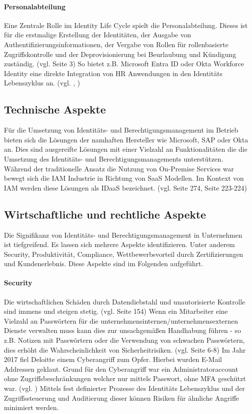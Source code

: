 \documentclass[11pt]{article}
\begin{document}
\paragraph{Personalabteilung}
Eine Zentrale Rolle im Identity Life Cycle spielt die Personalabteilung. Dieses ist für die erstmalige Erstellung der Identitäten, der Ausgabe von Authentifizierungsinformationen, der Vergabe von Rollen für rollenbasierte Zugriffskontrolle und der Deprovisionierung bei Beurlaubung und Kündigung zuständig. (vgl. \cite{mohammed2017systematic} Seite 3) So bietet z.B. Microsoft Entra ID oder Okta Workforce Identity eine direkte Integration von HR Anwendungen in den Identitäts Lebenszyklus an. (vgl. \cite{oktahr}, \cite{Billmath2024})
\subsection{Technische Aspekte}
Für die Umsetzung von Identitäts- und Berechtigungsmanagement im Betrieb bieten sich die Lösungen der namhaften Hersteller wie Microsoft, SAP oder Okta an. Dies sind ausgereifte Lösungen mit einer Vielzahl an Funktionalitäten die die Umsetzung des Identitäts- und Berechtigungsmanagements unterstützen. Während der traditionelle Ansatz die Nutzung von On-Premise Services war bewegt sich die IAM Industrie in Richtung von SaaS Modellen. Im Kontext von IAM werden diese Lösungen als IDaaS bezeichnet. (vgl. \cite{kunz2014analyzing} Seite 274, \cite{tsolkas2017} Seite 223-224)
\subsection{Wirtschaftliche und rechtliche Aspekte}
Die Signifikanz von Identitäts- und Berechtigungsmanagement in Unternehmen ist tiefgreifend. Es lassen sich mehrere Aspekte identifizieren. Unter anderem Security, Produktivität, Compliance, Wettbewerbsvorteil durch Zertifizierungen und Kundenerlebnis. Diese Aspekte sind im Folgenden aufgeführt.
\paragraph{Security}
Die wirtschaftlichen Schäden durch Datendiebstahl und unautorisierte Kontrolle sind immens und steigen stetig. (vgl. \cite{furnell2020understanding} Seite 154) Wenn ein Mitarbeiter eine Vielzahl an Passwörtern für die unternehmensinternen/unternehmensexternen Dienste verwalten muss kann dies zur unsachgemäßen Handhabung führen - so z.B. Notizen mit Passwörtern oder die Verwendung von schwachen Passwörtern, dies erhöht die Wahrscheinlichkeit von Sicherheitrisiken. (vgl. \cite{haag2012selecting} Seite 6-8) Im Jahr 2017 fiel Deloitte einem Cyberangriff zum Opfer. Hierbei wurden E-Mail Addressen geklaut. Grund für den Cyberangriff war ein Administratoraccount ohne Zugriffsbeschränkungen welcher nur mittels Passwort, ohne MFA geschützt war. (vgl. \cite{deloitte2017}) Mittels fest definierter Prozesse des Identitäts Lebenszyklus und der Zugriffssteuerung und Auditierung dieser können Risiken für ähnliche Angriffe minimiert werden.
\end{document}

